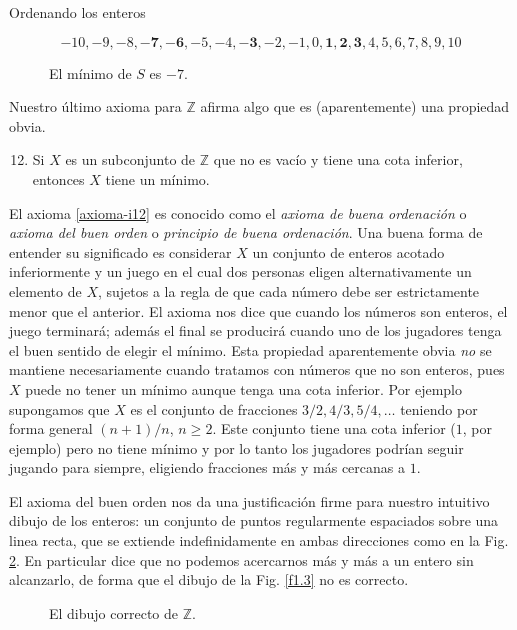 \begin{section}{Ordenando los enteros}


\begin{figure}[ht]
$$
-10, -9, -8, \mathbf{-7}, \mathbf{-6}, -5, -4, \mathbf{-3}, -2, -1, 0, \mathbf{1}, \mathbf{2}, \mathbf{3}, 
4, 5, 6, 7, 8, 9, 10
$$
\caption{El mínimo de $S$ es $-7$.}\label{f1.1}
\end{figure}


Nuestro último axioma para $\mathbb Z$ afirma algo que es (aparentemente) una propiedad obvia.
\begin{enumerate}[label=\textbf{I\arabic*)}, ref=\textbf{I\arabic*}]
    \setcounter{enumi}{11}
    \item \label{axioma-i12} Si $X$ es un subconjunto de $\mathbb Z$ que no es vacío y tiene una cota inferior, entonces $X$ tiene un mínimo.
\end{enumerate}

El axioma \ref{axioma-i12} es conocido como el  \textit{axioma de buena ordenación}  o  \textit{axioma del buen orden} o \textit{principio de buena ordenación}.  Una buena forma de entender su significado es considerar $X$ un conjunto de enteros acotado inferiormente  y un juego en el cual dos personas eligen alternativamente un elemento de $X$, sujetos a la regla de que cada número debe ser estrictamente menor que el anterior. El axioma nos dice que cuando los números son enteros, el juego terminará; además el final se producirá cuando uno de los jugadores tenga el buen sentido de elegir el mínimo. Esta propiedad aparentemente obvia \textit{no} se mantiene necesariamente cuando tratamos con números que no son enteros, pues $X$ puede no tener un mínimo aunque tenga una cota inferior. Por ejemplo supongamos que $X$ es el conjunto de fracciones $3/2, 4/3, 5/4, \ldots$ teniendo por forma general $(n+1)/n$, $n\ge 2$. Este conjunto tiene una cota inferior ($1$, por ejemplo) pero no tiene mínimo y por lo tanto los jugadores podrían seguir jugando para siempre, eligiendo fracciones más y más cercanas a $1$.

El axioma del buen orden nos da una justificación firme para nuestro intuitivo dibujo de los enteros: un conjunto de puntos regularmente espaciados sobre una linea recta, que se extiende indefinidamente en ambas direcciones como en la Fig. \ref{f1.2}. En particular dice que no podemos acercarnos más y más a un entero sin alcanzarlo, de forma que el dibujo de la Fig. \ref{f1.3} no es correcto.

\begin{figure}[ht]
    \begin{center}
    \end{center}
    \caption{El dibujo correcto de $\mathbb Z$.}\label{f1.2}
\end{figure}


\end{section}
